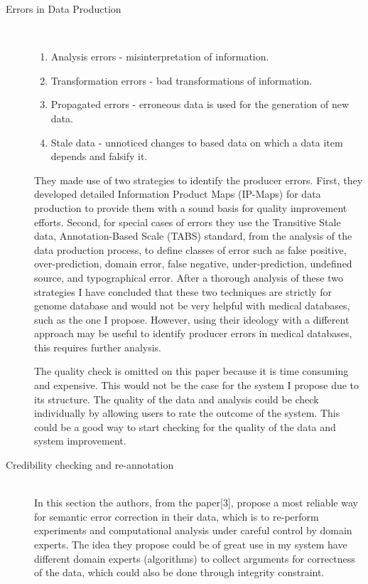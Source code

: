 \documentclass[sts]{sig-alternate}
\begin{document}
		\begin{description}
  			\item[Errors in Data Production]  \hfill \\
  				\begin{enumerate}
  					\item Analysis errors - misinterpretation of information.
  					\item Transformation errors - bad transformations of information.
  					\item Propagated errors - erroneous data is used for the generation of new data.
  					\item Stale data - unnoticed changes to based data on which a data item depends and 						falsify 	it.	
				\end{enumerate}
  			
				They made use of two strategies to identify the producer errors. First, they developed 					detailed Information Product Maps (IP-Maps) for data production to provide them with a 					sound basis for quality improvement efforts. Second, for special cases of errors they 					use the 	Transitive Stale data, Annotation-Based Scale (TABS) standard, from the 							analysis of the data production process, to define classes of error such as false 						positive, over-prediction, domain error, false negative, under-prediction, undefined 						source, and typographical error. After a thorough analysis of these two strategies I 						have concluded that these two techniques are strictly for genome database and would not 					be very helpful with medical databases, such as the one I propose. However, using their 					ideology with a different approach may be useful to identify producer errors in medical 					databases, this requires further analysis.\newline

				The quality check is omitted on this paper because it is time consuming and expensive. 					This would not be the case for the system I propose due to its structure. The quality of 				the data and analysis could be check individually by allowing users to rate the outcome 					of the system. This could be a good way to start checking for the quality of the data 					and system improvement.
		  			
  			\item[Credibility checking and re-annotation]  \hfill \\			
 				In this section the authors, from the paper[3], propose a most reliable way for semantic 				error correction in 	their data, which is to re-perform experiments and computational 						analysis under careful control by domain experts. The idea they propose could be of 						great use in my system have different domain experts (algorithms) to collect arguments 					for correctness of the data, which could also be done through integrity constraint.	
  			

\end{description}
\end{document}
